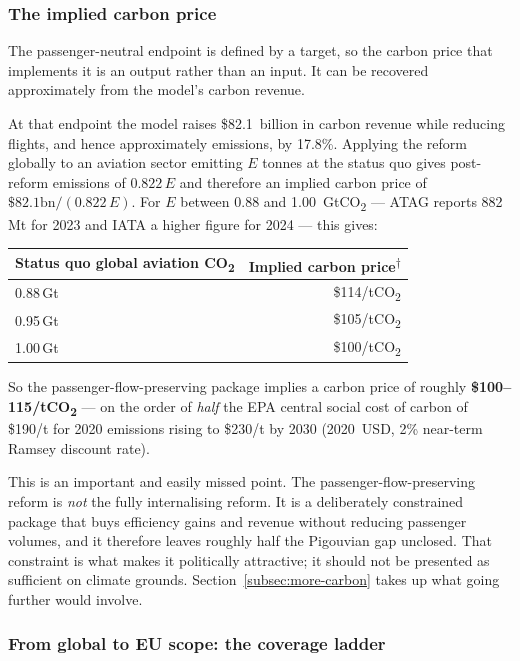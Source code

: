 \documentclass[11pt]{article}
\newcommand{\derived}{\textsuperscript{$\dagger$}}
\begin{document}
\subsubsection{The implied carbon price}
\label{subsec:implied}

The passenger-neutral endpoint is defined by a target, so the carbon price that
implements it is an output rather than an input. It can be recovered
approximately from the model's carbon revenue.

At that endpoint the model raises \$82.1~billion in carbon revenue while
reducing flights, and hence approximately emissions, by 17.8\%. Applying the
reform globally to an aviation sector emitting $E$ tonnes at the status quo
gives post-reform emissions of $0.822\,E$ and therefore an implied carbon price
of $\$82.1\text{bn}/(0.822\,E)$. For $E$ between 0.88 and 1.00~GtCO\textsubscript{2}
--- ATAG reports 882\,Mt for 2023 and IATA a higher figure for 2024 --- this
gives:

\begin{center}
\begin{tabular}{@{}lr@{}}
\toprule
Status quo global aviation CO\textsubscript{2} & Implied carbon price\derived{} \\
\midrule
0.88\,Gt & \$114/tCO\textsubscript{2} \\
0.95\,Gt & \$105/tCO\textsubscript{2} \\
1.00\,Gt & \$100/tCO\textsubscript{2} \\
\bottomrule
\end{tabular}
\end{center}

So the passenger-flow-preserving package implies a carbon price of roughly
\textbf{\$100--115/tCO\textsubscript{2}} --- on the order of \emph{half} the EPA
central social cost of carbon of \$190/t for 2020 emissions rising to \$230/t by
2030 (2020~USD, 2\% near-term Ramsey discount rate).

This is an important and easily missed point. The passenger-flow-preserving
reform is \emph{not} the fully internalising reform. It is a deliberately
constrained package that buys efficiency gains and revenue without reducing
passenger volumes, and it therefore leaves roughly half the Pigouvian gap
unclosed. That constraint is what makes it politically attractive; it should not
be presented as sufficient on climate grounds. Section~\ref{subsec:more-carbon}
takes up what going further would involve.

\subsubsection{From global to EU scope: the coverage ladder}
\label{subsec:scope}
\end{document}
